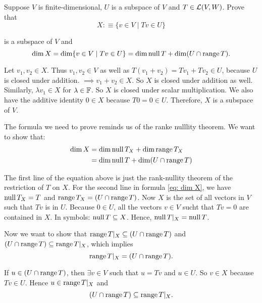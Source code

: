 \begin{xrcs}
  Suppose $V$ is finite-dimensional, $U$ is a subspace  of $V$ and $T \in \mathcal{L} (V,W)$. Prove that
  \begin{equation}
    X :\equiv \{v  \in V \mid Tv \in U \}
  \end{equation}

  is a subspace of $V$ and
  \begin{equation}
    \dim X = \dim \{v \in V \mid Tv \in U \} = \dim \operatorname{null} T + \dim (U \cap \operatorname{range} T).
  \end{equation}

  \begin{prf}
    Let $v_1, v_2 \in X$. Thus $v_1, v_2 \in V$ as well as $T(v_1 + v_2) = T v_1 + T v_2 \in U$, because $U$ is closed under addition. $\implies v_1 + v_2 \in X$. So $X$ is closed under addition as well. Similarly, $\lambda v_1 \in X$ for $\lambda \in \mathbb{F}$. So $X$ is closed under scalar multiplication. We also have the additive identity $0 \in X$ because $T0=0\in U$. Therefore, $X$ is a subspace of $V$.

    The formula we need to prove reminds us of the ranke nulllity theorem. We want to show that:
    \begin{equation}
      \label{eq: dim X}
      \begin{aligned}
        \dim X &= \dim \operatorname{null} T_X + \dim \operatorname{range} T_X \\
        &= \dim \operatorname{null} T + \dim (U \cap \operatorname{range} T)
      \end{aligned}
    \end{equation}

    The first line of the equation above is just the rank-nullity theorem of the restriction of $T$ on $X$. For the second line in formula \eqref{eq: dim X}, we have $\mynull T_X = \null T$ and
    $\operatorname{range} T_X = (U \cap \operatorname{range} T)$. Now $X$ is the set of all vectors in $V$ such that $Tv$ is in $U$. Because $0 \in U$, all the vectors $v \in V$ sucht that $Tv=0$ are contained in $X$. In symbols: $\operatorname{null} T \subseteq X$. Hence, $\operatorname{null} T|_X = \operatorname{null} T$.

    Now we want to show that $\operatorname{range} T|_X \subseteq (U \cap \operatorname{range} T)$ and $(U \cap \operatorname{range} T) \subseteq \operatorname{range} T|_X$, which implies
    \begin{equation}
      \operatorname{range} T|_X = (U \cap \operatorname{range} T).
    \end{equation}

    If $u \in (U \cap \operatorname{range} T)$, then $\exists v \in V$ such that $u=Tv$ and $u \in U$. So $v \in X$ because $Tv \in U$. Hence $u \in \operatorname{range} T|_X$ and
    \begin{equation}
      (U \cap \operatorname{range} T) \subseteq \operatorname{range} T|_X.
    \end{equation}


\end{prf}
\end{xrcs}
